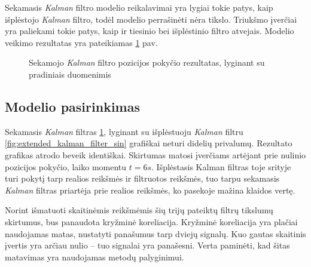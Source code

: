 Sekamasis \textit{Kalman} filtro modelio reikalavimai yra lygiai tokie patys, kaip išplėstojo \textit{Kalman} filtro, todėl modelio perrašinėti nėra tikslo.
Triukšmo įverčiai yra paliekami tokie patys, kaip ir tiesinio bei išplėstinio filtro atvejais.
Modelio veikimo rezultatas yra pateikiamas \ref{fig:unscented_kalman_filter_sin} pav.

\begin{figure}
    \centering
    \caption{Sekamojo \textit{Kalman} filtro pozicijos pokyčio rezultatas, lyginant su pradiniais duomenimis}
    \label{fig:unscented_kalman_filter_sin}
\end{figure}

\subsection{Modelio pasirinkimas}

Sekamasis \textit{Kalman} filtras \ref{fig:unscented_kalman_filter_sin}, lyginant su išplėstuoju \textit{Kalman} filtru \ref{fig:extended_kalman_filter_sin} grafiškai neturi didelių privalumų.
Rezultato grafikas atrodo beveik identiškai.
Skirtumas matosi įverčiams artėjant prie nulinio pozicijos pokyčio, laiko momentu $t=6s$.
Išplėstasis Kalman filtras toje srityje turi pokytį tarp realios reikšmės ir filtruotos reikšmės, tuo tarpu sekamasis \textit{Kalman} filtras priartėja prie realios reikšmės, ko pasekoje mažina klaidos vertę.

Norint išmatuoti skaitinėmis reikšmėmis šių trijų pateiktų filtrų tikslumų skirtumus, bus panaudota kryžminė koreliacija.
Kryžminė koreliacija yra plačiai naudojamas matas, nustatyti panašumus tarp dviejų signalų.
Kuo gautas skaitinis įvertis yra arčiau nulio -- tuo signalai yra panašesni.
Verta paminėti, kad šitas matavimas yra naudojamas metodų palyginimui.

